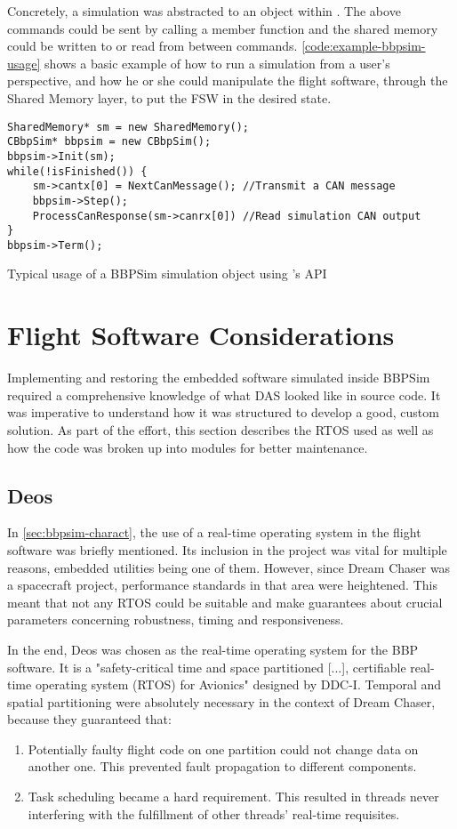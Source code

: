 {Concretely, a simulation was abstracted to an object within . The above commands could be sent by calling a member function and the shared memory could be written to or read from between commands.  \autoref{code:example-bbpsim-usage} shows a basic example of how to run a simulation from a user's perspective, and how he or she could manipulate the flight software, through the Shared Memory layer, to put the FSW in the desired state.
\begin{listing}[H]
	\begin{verbatim}
SharedMemory* sm = new SharedMemory();
CBbpSim* bbpsim = new CBbpSim();
bbpsim->Init(sm);
while(!isFinished()) {
	sm->cantx[0] = NextCanMessage(); //Transmit a CAN message
	bbpsim->Step();
	ProcessCanResponse(sm->canrx[0]) //Read simulation CAN output
}
bbpsim->Term();
	\end{verbatim}
	\caption{Typical usage of a BBPSim simulation object using 's API}
	\label{code:example-bbpsim-usage}
\end{listing}

\section{Flight Software Considerations}\label{sec:fsw-outline}
Implementing and restoring the embedded software simulated inside \gls{BBPSim} required a comprehensive knowledge of what DAS looked like in source code. It was imperative to understand how it was structured to develop a good, custom solution.  As part of the effort, this section describes the RTOS used as well as how the code was broken up into modules for better maintenance.

\subsection*{Deos}
In \autoref{sec:bbpsim-charact}, the use of a real-time operating system in the flight software was briefly mentioned. Its inclusion in the project was vital for multiple reasons, embedded utilities being one of them. However, since Dream Chaser was a spacecraft project, performance standards in that area were heightened. This meant that not any \gls{RTOS} could be suitable and make guarantees about crucial parameters concerning robustness, timing and responsiveness.

In the end, Deos was chosen as the real-time operating system for the BBP software. It is a "safety-critical time and space partitioned [...], certifiable real-time operating system (RTOS) for Avionics" designed by DDC-I\cite{on:ddci}. Temporal and spatial partitioning were absolutely necessary in the context of Dream Chaser, because they guaranteed that:
\begin{enumerate}
	\item Potentially faulty flight code on one partition could not change data on another one. This prevented fault propagation to different components\cite{reiger}.
	\item Task scheduling became a hard requirement. This resulted in threads never interfering with the fulfillment of other threads' real-time requisites\cite{rufino}.
\end{enumerate}

}
